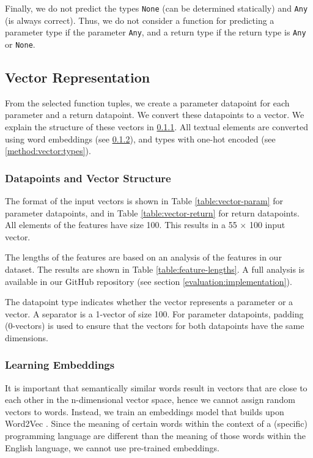 Finally, we do not predict the types \texttt{None} (can be determined statically) and \texttt{Any} (is always correct). Thus, we do not consider a function for predicting a parameter type if the parameter \texttt{Any}, and a return type if the return type is \texttt{Any} or \texttt{None}.

\subsection{Vector Representation} \label{method:vector}
From the selected function tuples, we create a parameter datapoint for each parameter and a return datapoint. We convert these datapoints to a vector. We explain the structure of these vectors in \ref{method:vector:structure}.  All textual elements are converted using word embeddings (see \ref{method:vector:embeddings}), and types with one-hot encoded (see \ref{method:vector:types}).

\subsubsection{Datapoints and Vector Structure} \label{method:vector:structure}



The format of the input vectors is shown in Table \ref{table:vector-param} for parameter datapoints, and in Table \ref{table:vector-return} for return datapoints. All elements of the features have size 100. This results in a 55 $\times$ 100 input vector.

The lengths of the features are based on an analysis of the features in our dataset. The results are shown in Table \ref{table:feature-lengths}. A full analysis is available in our GitHub repository (see section \ref{evaluation:implementation}).



The datapoint type indicates whether the vector represents a parameter or a vector. A separator is a 1-vector of size 100. For parameter datapoints, padding (0-vectors) is used to ensure that the vectors for both datapoints have the same dimensions.

\subsubsection{Learning Embeddings} \label{method:vector:embeddings}
It is important that semantically similar words result in vectors that are close to each other in the n-dimensional vector space, hence we cannot assign random vectors to words. Instead, we train an embeddings model that builds upon Word2Vec \cite{Mikolov2013EfficientSpace}. Since the meaning of certain words within the context of a (specific) programming language are different than the meaning of those words within the English language, we cannot use pre-trained embeddings.

